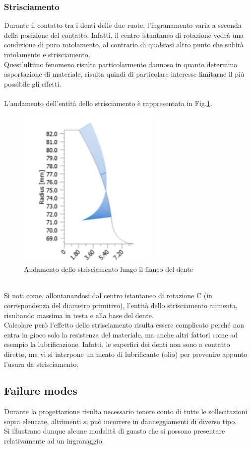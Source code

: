 \subsubsection{Strisciamento}
Durante il contatto tra i denti delle due ruote, l'ingranamento varia a seconda della posizione del contatto. Infatti, il centro istantaneo di rotazione vedrà una condizione di puro rotolamento, al contrario di qualsiasi altro punto che subirà rotolamento e strisciamento.\\
Quest'ultimo fenomeno risulta particolarmente dannoso in quanto determina asportazione di materiale, risulta quindi di particolare interesse limitarne il più possibile gli effetti. \\
\\
L'andamento dell'entità dello strisciamento è rappresentata in Fig.\ref{fig:Strisciamento}.
\begin{figure}[h]
    \centering
    \includegraphics[scale=0.65]{Immagini/Strisciamento.png}
    \caption{Andamento dello strisciamento lungo il fianco del dente}
    \label{fig:Strisciamento}
\end{figure}
\\
Si noti come, allontanandosi dal centro istantaneo di rotazione C (in corrispondenza del diametro primitivo), l'entità dello strisciamento aumenta, risultando massima in testa e alla base del dente.\\
Calcolare però l’effetto dello strisciamento risulta essere complicato perché non entra in gioco solo la resistenza del materiale, ma anche altri fattori come ad esempio la lubrificazione. Infatti, le superfici dei denti non sono a contatto diretto, ma vi si interpone un meato di lubrificante (olio) per prevenire appunto l’usura da strisciamento.
\subsection{Failure modes}
Durante la progettazione risulta necessario tenere conto di tutte le sollecitazioni sopra elencate, altrimenti si può incorrere in danneggiamenti di diverso tipo.\\
Si illustrano dunque alcune modalità di guasto che si possono presentare relativamente ad un ingranaggio.
